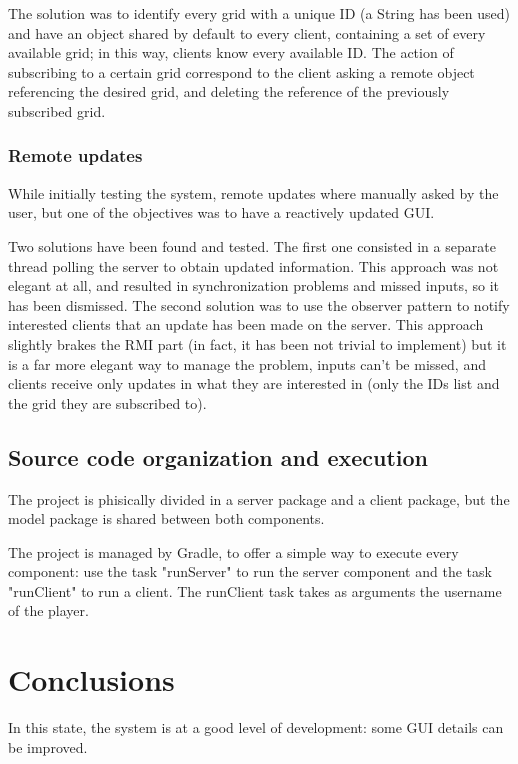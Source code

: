 \documentclass[12pt, a4paper]{report}
\begin{document}
The solution was to identify every grid with a unique ID (a String has been
 used) and have an object shared by default to every client, containing a set
 of every available grid; in this way, clients know every available ID. The
 action of subscribing to a certain grid correspond to the client asking a
 remote object referencing the desired grid, and deleting the reference of the
 previously subscribed grid.

\subsection{Remote updates}
While initially testing the system, remote updates where manually asked by the
 user, but one of the objectives was to have a reactively updated GUI.

Two solutions have been found and tested. The first one consisted in a separate
 thread polling the server to obtain updated information. This approach was not
 elegant at all, and resulted in synchronization problems and missed inputs, so
 it has been dismissed. The second solution was to use the observer pattern to
 notify interested clients that an update has been made on the server. This
 approach slightly brakes the RMI part (in fact, it has been not trivial to
 implement) but it is a far more elegant way to manage the problem, inputs
 can't be missed, and clients receive only updates in what they are interested
 in (only the IDs list and the grid they are subscribed to).

\section{Source code organization and execution}
The project is phisically divided in a server package and a client package, but
 the model package is shared between both components.

The project is managed by Gradle, to offer a simple way to execute every
 component: use the task "runServer" to run the server component and the task
 "runClient" to run a client. The runClient task takes as arguments the
 username of the player.

\chapter{Conclusions}
In this state, the system is at a good level of development: some GUI details
 can be improved.



\end{document}
